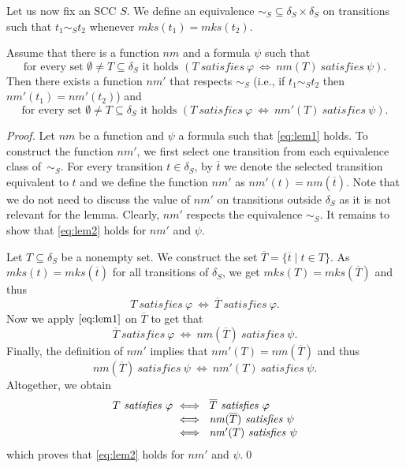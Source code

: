 \documentclass[runningheads]{llncs}
\newcommand{\mks}{\mathit{mks}}
\newcommand{\rem}{\mathit{nm}}
\newcommand{\msat}{\mathit{satisfies}}
\begin{document}
Let us now fix an SCC $S$. We define an equivalence
${\sim_S}\subseteq\delta_S\times\delta_S$ on transitions %
such that $t_1\sim_S t_2$ whenever $\mks(t_1)=\mks(t_2)$.
\begin{lemma} Assume that there is a function $\rem$ and a formula
  $\psi$ such that
  \[
    \textrm{for every set $\emptyset\neq T\subseteq\delta_S$ it holds }
      (T~\msat~\varphi~\iff~\rem(T)~\msat~\psi).\tag{$1$}\label{eq:lem1} 
  \]  
  Then there exists a function $\rem'$ that respects %
  $\sim_S$ (i.e.,
  if $t_1\sim_S t_2$ then $\rem'(t_1)=\rem'(t_2)$) and
  \[
    \textrm{for every set $\emptyset\neq T\subseteq\delta_S$ it holds }
    (T~\msat~\varphi~\iff~\rem'(T)~\msat~\psi).\tag{$2$}\label{eq:lem2} 
  \]  
\end{lemma}
\begin{proof}
  Let $\rem$ be a function and $\psi$ a formula such that
  \eqref{eq:lem1} holds. To construct the function $\rem'$, we first
  select one transition from each equivalence class of~$\sim_S$. For
  every transition $t\in\delta_S$, by $\overline{t}$ we denote the
  selected transition equivalent to $t$ and we define the function
  $\rem'$ as $\rem'(t)=\rem(\overline{t})$. Note that we do not need
  to discuss the value of $\rem'$ on transitions outside $\delta_S$ as
  it is not relevant for the lemma. Clearly, $\rem'$ respects the
  equivalence $\sim_S$. It remains to show that \eqref{eq:lem2} holds
  for $\rem'$ and $\psi$.

  Let $T\subseteq\delta_S$ be a %
  nonempty set. We construct
  the set $\overline{T}=\{\overline{t}\mid t\in T\}$. As
  $\mks(t)=\mks(\overline{t})$ for all transitions of $\delta_S$, we
  get $\mks(T)=\mks(\overline{T})$ and thus
  \[
    T~\msat~\varphi~\iff~\overline{T}~\msat~\varphi.
  \]
  Now we apply $\eqref{eq:lem1}$ on $\overline{T}$ to get that
  \[
    \overline{T}~\msat~\varphi~\iff~\rem(\overline{T})~\msat~\psi.
  \]
  Finally, the definition of $\rem'$ implies that
  $\rem'(T)=\rem(\overline{T})$ and thus
  \[
    \rem(\overline{T})~\msat~\psi~\iff~\rem'(T)~\msat~\psi.
  \]
  Altogether, we obtain
  \[
    \setlength{\arraycolsep}{0pt}
    \begin{array}{rl}
      T~\msat~\varphi~ 
      & \iff~\overline{T}~\msat~\varphi \\
      & \iff~\rem(\overline{T})~\msat~\psi\\
      & \iff~\rem'(T)~\msat~\psi
    \end{array}
  \]
  which proves that \eqref{eq:lem2} holds for $\rem'$ and $\psi$.\qed
\end{proof}
\end{document}
